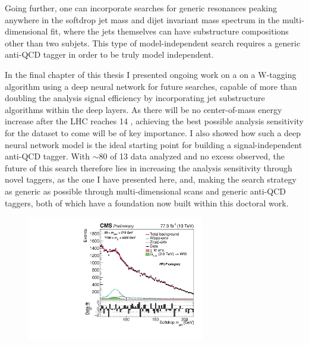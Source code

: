 Going further, one can incorporate searches for generic resonances peaking anywhere in the softdrop jet mass and dijet invariant mass spectrum in the multi-dimensional fit, where the jets themselves can have substructure compositions other than two subjets. This type of model-independent search requires a generic anti-QCD tagger in order to be truly model independent. \par
In the final chapter of this thesis I presented ongoing work on a on a W-tagging algorithm using a deep neural network for future searches, capable of more than doubling the analysis signal efficiency by incorporating jet substructure algorithms within the deep layers. As there will be no center-of-mass energy increase after the LHC reaches 14 \TeV, achieving the best possible analysis sensitivity for the dataset to come will be of key importance. I also showed how such a deep neural network model is the ideal starting point for building a signal-independent anti-QCD tagger. With $\sim80$ \fbinv of 13 \TeV data analyzed and no excess observed, the future of this search therefore lies in increasing the analysis sensitivity through novel taggers, as the one I have presented here, and, making the search strategy as generic as possible through multi-dimensional scans and generic anti-QCD taggers, both of which have a foundation now built within this doctoral work.
\begin{figure}[b!]
\centering
\includegraphics[width=0.69\textwidth]{figures/analysis/search3/AN-17-303/postfitchecks/postfit_HPLP_unblind/PostFitComboHPLP_X-Proj__y___0_-1_z___0_-1.pdf}
\label{fig:summary}
\end{figure}